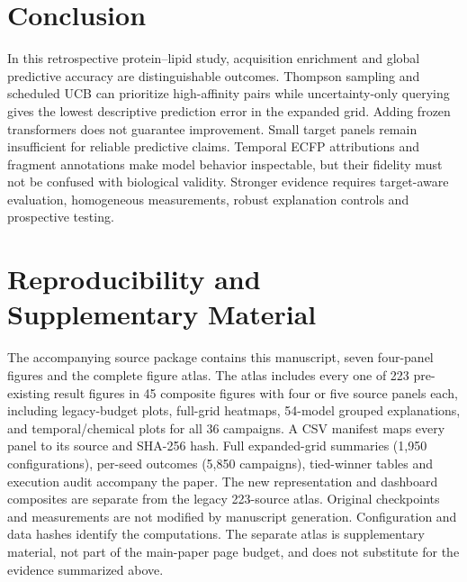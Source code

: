 \documentclass[wcp]{jmlr}
\begin{document}
\section{Conclusion}
In this retrospective protein--lipid study, acquisition enrichment and
global predictive accuracy are distinguishable outcomes. Thompson sampling
and scheduled UCB can prioritize high-affinity pairs while uncertainty-only
querying gives the lowest descriptive prediction error in the expanded grid.
Adding frozen transformers does not guarantee improvement. Small target panels
remain insufficient for reliable predictive claims. Temporal ECFP
attributions and fragment annotations make model behavior inspectable,
but their fidelity must not be confused with biological validity. Stronger
evidence requires target-aware evaluation, homogeneous measurements,
robust explanation controls and prospective testing.

\section*{Reproducibility and Supplementary Material}
The accompanying source package contains this manuscript, seven four-panel
figures and the complete figure atlas. The atlas includes every one of
223 pre-existing result figures in 45 composite figures with four or five
source panels each, including legacy-budget plots, full-grid heatmaps,
54-model grouped explanations, and temporal/chemical plots for all 36
campaigns. A CSV manifest maps every panel to its source and SHA-256 hash.
Full expanded-grid summaries (1,950 configurations), per-seed outcomes
(5,850 campaigns), tied-winner tables and execution audit accompany the paper.
The new representation and dashboard composites are separate from the legacy
223-source atlas. Original checkpoints and measurements are not modified by manuscript
generation. Configuration and data hashes identify the computations.
The separate atlas is supplementary material, not part of the main-paper
page budget, and does not substitute for the evidence summarized above.
\end{document}
